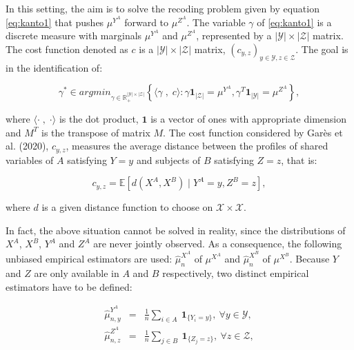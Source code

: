 In this setting, the aim is to solve the recoding problem given by equation \eqref{eq:kanto1} that pushes \(\mu^{Y^A}\) forward to \(\mu^{Z^A}\).
The variable \(\gamma\) of \eqref{eq:kanto1} is a discrete measure with marginals \(\mu^{Y^A}\) and \(\mu^{Z^A}\), represented by a \(|\mathcal{Y}| \times |\mathcal{Z}|\) matrix.
The cost function denoted as \(c\) is a \(|\mathcal{Y}| \times |\mathcal{Z}|\) matrix, \((c_{y,z})_{y\in \mathcal{Y},z\in \mathcal{Z}}\).
The goal is in the identification of:

\begin{equation}
\gamma^*\in argmin_{\gamma \in \mathbb{R}_+^{|\mathcal{Y}| \times |\mathcal{Z}|}}\left\{\langle \gamma  \; ,\; c \rangle : \gamma \mathbf{1}_{|\mathcal{Z}|} = \mu^{Y^A},\gamma^T \mathbf{1}_{|\mathcal{Y}|} = \mu^{Z^A}\right\},
\label{eq:modeldim}
\end{equation}

where \(\langle \cdot \;,\; \cdot \rangle\)
is the dot product, \(\mathbf{1}\) is a vector of ones with appropriate dimension and \(M^T\) is the transpose of matrix \(M\). The cost function considered by Garès et al. (2020), \(c_{y,z}\), measures the average distance between the profiles of shared variables of \(A\) satisfying \(Y=y\) and subjects of \(B\) satisfying \(Z=z\), that is:

\begin{equation}
c_{y,z} = \mathbb{E} \left[d(X^A,X^B) \mid Y^A= y, Z^B= z\right],
\label{eq:costgroup}
\end{equation}

where \(d\) is a given distance function to choose on \(\mathcal{X} \times \mathcal{X}\).

In fact, the above situation cannot be solved in reality, since the distributions of \(X^A\), \(X^B\), \(Y^A\) and \(Z^A\) are never jointly observed. As a consequence, the following unbiased empirical estimators are used: \(\hat{\mu}^{X^A}_n\) of \({\mu}^{X^A}\) and \(\hat{\mu}^{X^B}_n\) of \({\mu}^{X^B}\). Because \(Y\) and \(Z\) are only available in \(A\) and \(B\) respectively, two distinct empirical estimators have to be defined:

\begin{equation}
    \begin{aligned}
        \hat{\mu}^{Y^A}_{n,y} & = & \frac{1}{n}\sum_{i\in A} ~\mathbf{1}_{\{Y_i = y\}},\: \forall y\in\mathcal{Y},\\
        \hat{\mu}^{Z^A}_{n,z} & = & \frac{1}{n}\sum_{j\in B} ~\mathbf{1}_{\{Z_j = z\}},\: \forall z\in \mathcal{Z},
    \end{aligned}
    \label{eq:estimatoroutcomes}
 \end{equation}

